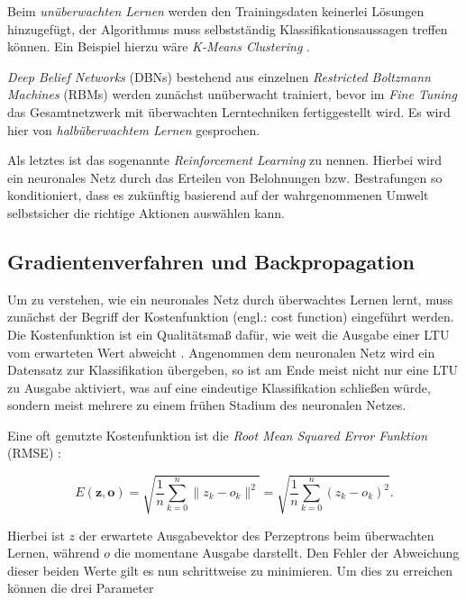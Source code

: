 Beim \textit{unüberwachten Lernen} werden den Trainingsdaten keinerlei Lösungen hinzugefügt, der Algorithmus muss selbstständig Klassifikationsaussagen treffen können. Ein Beispiel hierzu wäre \textit{K-Means Clustering} \cite{AurelienGeron.2018}. 

\textit{Deep Belief Networks} (DBNs) bestehend aus einzelnen \textit{Restricted Boltzmann Machines} (RBMs) werden zunächst unüberwacht trainiert, bevor im \textit{Fine Tuning} das Gesamtnetzwerk mit überwachten Lerntechniken fertiggestellt wird. Es wird hier von \textit{halbüberwachtem Lernen} gesprochen.

Als letztes ist das sogenannte \textit{Reinforcement Learning} zu nennen. Hierbei wird ein neuronales Netz durch das Erteilen von Belohnungen bzw. Bestrafungen so konditioniert, dass es zukünftig basierend auf der wahrgenommenen Umwelt selbstsicher die richtige Aktionen  auswählen kann.

\subsection*{Gradientenverfahren und Backpropagation}

Um zu verstehen, wie ein neuronales Netz durch überwachtes Lernen \glqq lernt\grqq{}, muss zunächst der Begriff der Kostenfunktion (engl.: cost function) eingeführt werden. Die Kostenfunktion ist ein Qualitätsmaß dafür, wie weit die Ausgabe einer LTU vom erwarteten Wert abweicht \cite{AurelienGeron.2018}. Angenommen dem neuronalen Netz wird ein Datensatz zur Klassifikation übergeben, so ist am Ende meist nicht nur eine LTU zu Ausgabe aktiviert, was auf eine eindeutige Klassifikation schließen würde, sondern meist mehrere zu einem frühen Stadium des neuronalen Netzes.

Eine oft genutzte Kostenfunktion ist die \textit{Root Mean Squared Error Funktion} (RMSE) \cite{AurelienGeron.2018}:

\begin{equation} \label{mse}
E(\boldsymbol{z},\boldsymbol{o}) = \sqrt{\frac{1}{n}\sum_{k=0}^n \lVert{z_k-o_k}\rVert^2} = \sqrt{\frac{1}{n}\sum_{k=0}^n (z_k-o_k)^2}.
\end{equation}

Hierbei ist $z$ der erwartete Ausgabevektor des Perzeptrons beim überwachten Lernen, während $o$ die momentane Ausgabe darstellt. Den Fehler der Abweichung dieser beiden Werte gilt es nun schrittweise zu minimieren. Um dies zu erreichen können die drei Parameter


